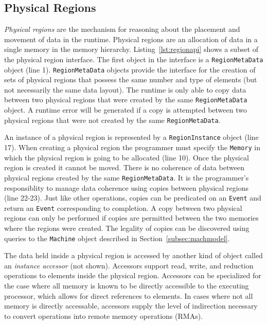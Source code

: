 \subsection{Physical Regions}
\label{subsec:phyreg}

{\em Physical regions} are the mechanism for reasoning about
the placement and movement of data in the runtime.  Physical regions are an 
allocation of data in a single memory in the memory hierarchy.  Listing~\ref{lst:regionapi} 
shows a subset of the physical region interface.  The first object in the interface
is a {\tt RegionMetaData} object (line 1).  {\tt RegionMetaData} objects provide the interface for the
creation of sets of physical regions that possess the same number and type of elements (but not necessarily
the same data layout).  The runtime is only able
to copy data between two physical regions that were created by the
same {\tt RegionMetaData} object.  A runtime error will be generated if a copy is attempted
between two physical regions that were not created by the same {\tt RegionMetaData}.

An instance of a physical region is represented by a {\tt RegionInstance} object (line 17).
When creating a physical region the programmer must specify the {\tt Memory}
in which the physical region is going to be allocated (line 10).  Once the physical region is created it
cannot be moved.   There is no coherence of data between physical regions created by the 
same {\tt RegionMetaData}.  It is the programmer's responsiblity to manage data coherence
using copies between physical regions (line 22-23).  Just like other operations,
copies can be predicated on an {\tt Event} and return an {\tt Event} corresponding to
completion.  A copy between two physical regions can only be performed if copies
are permitted between the two memories where the regions were created.  
The legality of copies can be discovered using queries to the {\tt Machine} object
described in Section~\ref{subsec:machmodel}.

The data held inside a physical region is accessed by another kind of object called an
{\em instance accessor} (not shown).  Accessors support read, write, and reduction operations
to elements inside the physical region.  Accessors can be specialized for the case where
all memory is known to be directly accessible to the executing processor, which allows 
for direct references to elements.  In cases where not all memory is directly accessable, 
accessors supply the level of indirection necessary to convert operations into remote 
memory operations (RMAs).  %

